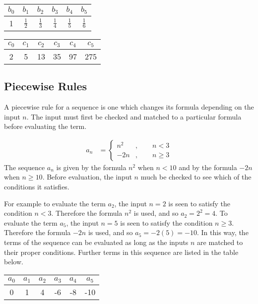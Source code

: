 \documentclass[11pt,a4paper,titlepage,oneside,openany]{article}
\begin{document}
\begin{center}
\begin{tabular}{|c|c|c|c|c|c|}
\hline
$b_0$ & $b_1$ & $b_2$ & $b_3$ & $b_4$ & $b_5$ \\
\hline
  1 & $\frac{1}{2}$ & $\frac{1}{3}$  & $\frac{1}{4}$  & $\frac{1}{5}$  & $\frac{1}{6}$   \\
\hline
\end{tabular}
\end{center}

\begin{center}
\begin{tabular}{|c|c|c|c|c|c|}
\hline
$c_0$ & $c_1$ & $c_2$ & $c_3$ & $c_4$ & $c_5$ \\
\hline
  2 & 5 & 13 & 35 & 97 & 275  \\
\hline
\end{tabular}
\end{center}

\subsection*{Piecewise Rules}

A piecewise rule for a sequence is one which changes its formula depending on the input $n$. The input must first be checked and matched to a particular formula before evaluating the term. 

\begin{align*}
  a_n&= \begin{cases}
    n^2 &,\qquad n < 3\\
    -2n &,\qquad n \ge 3
  \end{cases}
\end{align*}
The sequence $a_n$ is given by the formula $n^2$ when $n<10$ and by the formula $-2n$ when $n \ge 10$. Before evaluation, the input $n$ much be checked to see which of the conditions it satisfies.

For example to evaluate the term $a_2$, the input $n=2$ is seen to satisfy the condition $n<3$. Therefore the formula $n^2$ is used, and so $a_2=2^2=4$. To evaluate the term $a_5$, the input $n=5$ is seen to satisfy the condition $n \ge3$. Therefore the formula $-2n$ is used, and so $a_5=-2(5) = -10$. In this way, the terms of the sequence can be evaluated as long as the inputs $n$ are matched to their proper conditions. Further terms in this sequence are listed in the table below.
\begin{center}
\begin{tabular}{|c|c|c|c|c|c|}
\hline
$a_0$ & $a_1$ & $a_2$ & $a_3$ & $a_4$ & $a_5$ \\
\hline
  0 & 1 & 4 & -6 & -8 & -10  \\
\hline
\end{tabular}
\end{center}
\end{document}
